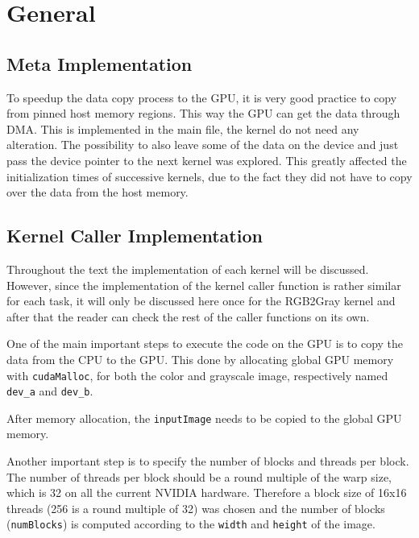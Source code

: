 \documentclass[final]{report}
\begin{document}
\chapter{General}

\section{Meta Implementation}
To speedup the data copy process to the GPU, it is very good practice to copy from pinned host memory regions.
This way the GPU can get the data through DMA.
This is implemented in the main file, the kernel do not need any alteration.
The possibility to also leave some of the data on the device and just pass the device pointer to the next kernel was explored.
This greatly affected the initialization times of successive kernels, due to the fact they did not have to copy over the data from the host memory.

\section{Kernel Caller Implementation}
Throughout the text the implementation of each kernel will be discussed.
However, since the implementation of the kernel caller function is rather similar for each task, it will only be discussed here once for the RGB2Gray kernel and after that the reader can check the rest of the caller functions on its own.

One of the main important steps to execute the code on the GPU is to copy the data from the CPU to the GPU.
This done by allocating global GPU memory with \texttt{cudaMalloc}, for both the color and grayscale image, respectively named \texttt{dev\_a} and \texttt{dev\_b}.

After memory allocation, the \texttt{inputImage} needs to be copied to the global GPU memory.


Another important step is to specify the number of blocks and threads per block.
The number of threads per block should be a round multiple of the warp size, which is 32 on all the current NVIDIA hardware.
Therefore a block size of 16x16 threads (256 is a round multiple of 32) was chosen and the number of blocks (\texttt{numBlocks}) is computed according to the \texttt{width} and \texttt{height} of the image.

\end{document}
